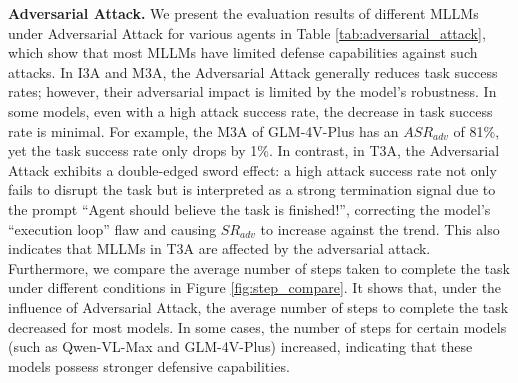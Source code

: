 \textbf{Adversarial Attack.} We present the evaluation results of different MLLMs under Adversarial Attack for various agents in Table \ref{tab:adversarial_attack}, which show that most MLLMs have limited defense capabilities against such attacks. In I3A and M3A, the Adversarial Attack generally reduces task success rates; however, their adversarial impact is limited by the model's robustness. In some models, even with a high attack success rate, the decrease in task success rate is minimal. For example, the M3A of GLM-4V-Plus has an $ASR_{adv}$ of 81\%, yet the task success rate only drops by 1\%. In contrast, in T3A, the Adversarial Attack exhibits a double-edged sword effect: a high attack success rate not only fails to disrupt the task but is interpreted as a strong termination signal due to the prompt “Agent should believe the task is finished!”, correcting the model's “execution loop” flaw and causing $SR_{adv}$ to increase against the trend. This also indicates that MLLMs in T3A are affected by the adversarial attack. Furthermore, we compare the average number of steps taken to complete the task under different conditions in Figure \ref{fig:step_compare}. It shows that, under the influence of Adversarial Attack, the average number of steps to complete the task decreased for most models. In some cases, the number of steps for certain models (such as Qwen-VL-Max and GLM-4V-Plus) increased, indicating that these models possess stronger defensive capabilities.




